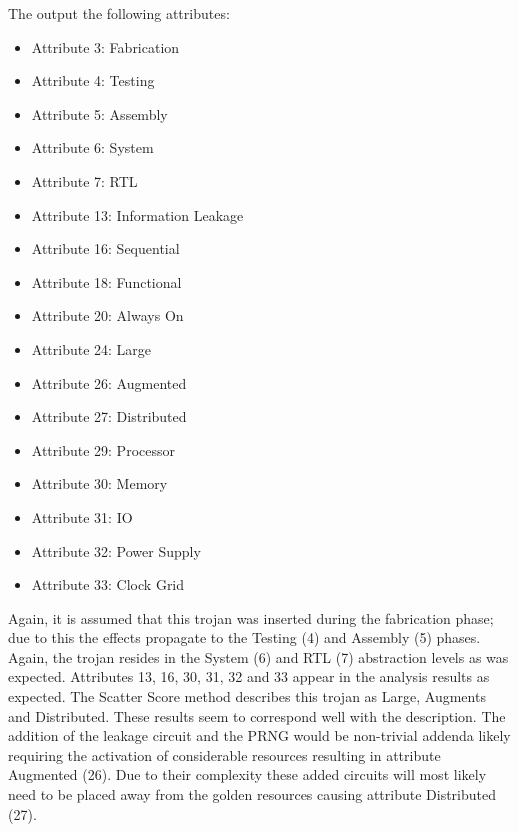 The \NameNoPeriod output the following attributes:
\begin{itemize}
	\item Attribute 3: Fabrication
	\item Attribute 4: Testing
	\item Attribute 5: Assembly
	\item Attribute 6: System
	\item Attribute 7: RTL
	\item Attribute 13: Information Leakage
	\item Attribute 16: Sequential
	\item Attribute 18: Functional
	\item Attribute 20: Always On
	\item Attribute 24: Large
	\item Attribute 26: Augmented
	\item Attribute 27: Distributed
	\item Attribute 29: Processor
	\item Attribute 30: Memory
	\item Attribute 31: \acrshort{IO}
	\item Attribute 32: Power Supply
	\item Attribute 33: Clock Grid
\end{itemize}

Again, it is assumed that this trojan was inserted during the fabrication phase; due to this the effects propagate to the Testing (4) and Assembly (5) phases.
Again, the trojan resides in the System (6) and \acrshort{RTL} (7) abstraction levels as was expected.
Attributes 13, 16, 30, 31, 32 and 33 appear in the analysis results as expected.
The Scatter Score method describes this trojan as Large, Augments and Distributed. 
These results seem to correspond well with the description. 
The addition of the leakage circuit and the PRNG would be non-trivial addenda likely requiring the activation of considerable resources resulting in attribute Augmented (26).
Due to their complexity these added circuits will most likely need to be placed away from the \gls{golden} resources causing attribute Distributed (27).
